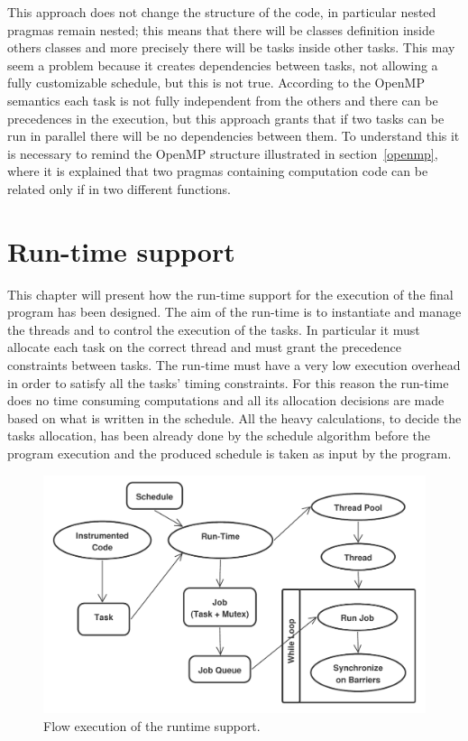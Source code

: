 \documentclass[a4paper,12pt,oneside]{book}
\begin{document}
This approach does not change the structure of the code, in particular nested pragmas remain nested; this means that there will be classes definition inside others classes and more precisely there will be tasks inside other tasks. This may seem a problem because it creates dependencies between tasks, not allowing a fully customizable schedule, but this is not true. According to the OpenMP semantics each task is not fully independent from the others and there can be precedences in the execution, but this approach grants that if two tasks can be run in parallel there will be no dependencies between them. To understand this it is necessary to remind the OpenMP structure illustrated in section~\ref{openmp}, where it is explained that two pragmas containing computation code can be related only if in two different functions. 


\section{Run-time support}

This chapter will present how the run-time support for the execution of the final program has been designed. The aim of the run-time is to instantiate and manage the threads and to control the execution of the tasks. In particular it must allocate each task on the correct thread and must grant the precedence constraints between tasks. The run-time must have a very low execution overhead in order to satisfy all the tasks' timing constraints. For this reason the run-time does no time consuming computations and all its allocation decisions are made based on what is written in the schedule. All the heavy calculations, to decide the tasks allocation, has been already done by the schedule algorithm before the program execution and the produced schedule is taken as input by the program. 

\begin{figure}
\centering
\includegraphics[scale=0.6]{runtime_execution.pdf}
\caption{Flow execution of the runtime support.}
\end{figure}
\end{document}
